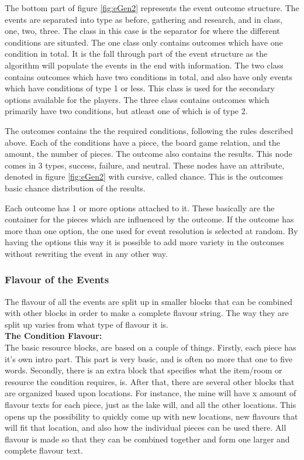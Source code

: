 The bottom part of figure \ref{fig:eGen2} represents the event outcome structure. The events are separated into type as before, gathering and research, and in class, one, two, three. 
The class in this case is the separator for where the different conditions are situated. The one class only contains outcomes which have one condition in total. It is the fall through part of the event structure as the algorithm will populate the events in the end with information.
The two class contains outcomes which have two conditions in total, and also have only events which have conditions of type 1 or less. 
This class is used for the secondary options available for the players.
The three class contains outcomes which primarily have two conditions, but atleast one of which is of type 2.

The outcomes contains the the required conditions, following the rules described above. Each of the conditions have a piece, the board game relation, and the amount, the number of pieces. 
The outcome also contains the results. This node comes in 3 types, success, failure, and neutral. These nodes have an attribute, denoted in figure \ref{fig:eGen2} with cursive, called chance. This is the outcomes basic chance distribution of the results. 

Each outcome has 1 or more options attached to it. These basically are the container for the pieces which are influenced by the outcome. If the outcome has more than one option, the one used for event resolution is selected at random. 
By having the options this way it is possible to add more variety in the outcomes without rewriting the event in any other way.

\subsubsection{Flavour of the Events}


The flavour of all the events are split up in smaller blocks that can be combined with other blocks in order to make a complete flavour string. The way they are split up varies from what type of flavour it is.\\

\textbf{The Condition Flavour:}\\

The basic resource blocks, are based on a couple of things. Firstly, each piece has it's own intro part. This part is very basic, and is often no more that one to five words. Secondly, there is an extra block that specifies what the item/room or resource the condition requires, is. After that, there are several other blocks that are organized based upon locations. For instance, the mine will have x amount of flavour texts for each piece, just as the lake will, and all the other locations. This opens up the possibility to quickly come up with new locations, new flavours that will fit that location, and also how the individual pieces can be used there. All flavour is made so that they can be combined together and form one larger and complete flavour text.\\

